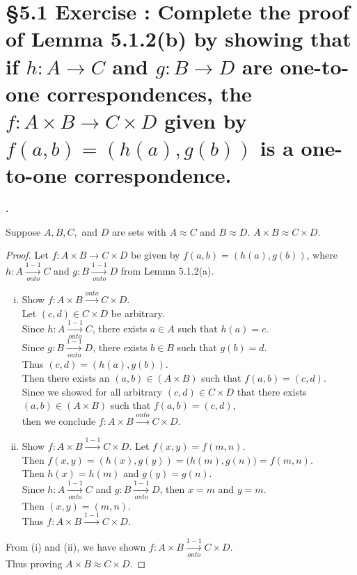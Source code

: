 \documentclass[a4paper,11pt]{article}
\begin{document}
\section*{\S 5.1 Exercise : Complete the proof of Lemma 5.1.2{(b)} by showing that if \(h:A \rightarrow C\) and \(g:B \rightarrow D\) are one-to-one correspondences, the \(f:A \times B \rightarrow C \times D\) given by \(f{(a,b)} = {(h{(a)},g{(b)})}\) is a one-to-one correspondence.}
\setcounter{SubsectionCounter}{2}
\textbf{.}
\begin{theorem1}
  Suppose \(A,B,C,\) and \(D\) are sets with \(A \approx C\) and \(B \approx 
  D\). \(A \times B \approx C \times D\).
  \begin{proof}
    Let \(f:A \times B \rightarrow C \times D\) be given by \(f{(a,b)} = 
    {(h{(a)},g{(b)})}\), where \(h:A \xrightarrow[onto]{1-1} C\) and \(g:B \xrightarrow[onto]{1-1} 
    D\) from Lemma 5.1.2{(a)}.
    \begin{enumerate}[(i)]
      \item Show \(f: A \times B \xrightarrow{onto} C \times D\).\\
      Let \({(c,d)} \in C \times D\) be arbitrary.\\
      Since \(h:A \xrightarrow[onto]{1-1} C\), there exists \(a \in A\) such 
      that \(h{(a)} = c\).\\
      Since \(g:B \xrightarrow[onto]{1-1} D\), there exists \(b \in B\) such 
      that \(g{(b)} = d\).\\
      Thus \({(c,d)}={(h{(a)},g{(b)})}\).\\
      Then there exists an \({(a,b)} \in {(A \times B)}\) such that \(f{(a,b)} = 
      {(c,d)}\).\\
      Since we showed for all arbitrary \({(c,d)} \in C \times D\) that there exists 
      \({(a,b)} \in {(A \times B)}\) such that \(f{(a,b)} = {(c,d)}\), \\
      then we conclude \(f:A \times B \xrightarrow{onto} C \times D\).
      \newpage
      \item Show \(f: A \times B \xrightarrow{1-1} C \times D\).
      Let \(f{(x,y)} = f{(m,n)}\).\\
      Then \(f{(x,y)} = {(h{(x)},g{(y)})} = {(h{(m)}, g{(n)}}) = f{(m,n)}\).\\
      Then \(h{(x)}=h{(m)}\) and \(g{(y)} = g{(n)}\).\\
      Since \(h:A \xrightarrow[onto]{1-1} C\) and \(g:B \xrightarrow[onto]{1-1} 
    D\), then \(x=m\) and \(y=m\).\\
    Then \({(x,y)}={(m,n)}\).\\
    Thus \(f: A \times B \xrightarrow{1-1} C \times D\).
    \end{enumerate}
    From {(i)} and {(ii)}, we have shown \(f:A \times B \xrightarrow[onto]{1-1} C \times D\).\\ 
    Thus proving \(A \times B \approx C \times D\).
  \end{proof}
\end{theorem1}
\newpage
\setcounter{ProblemCounter}{7}
\end{document}
